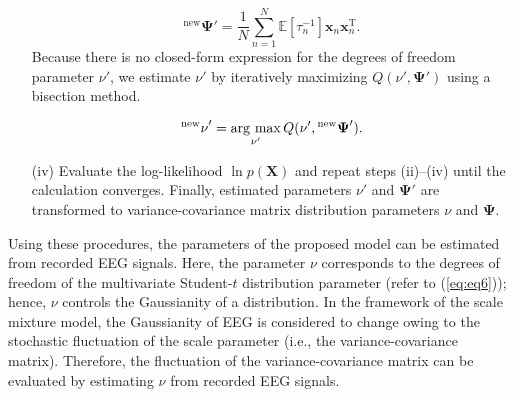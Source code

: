 \documentclass[journal]{IEEEtran}
\newcommand{\argmax}{\mathop{\rm arg\ max}\limits}
\begin{document}
\begin{enumerate}
\begin{equation}%
{^\mathrm{new} \mathbf{\Psi}}' = \frac{1}{N} \sum_{n=1}^{N} \mathbb{E}\left[\tau^{-1}_n\right] \mathbf{x}_n \mathbf{x}_n^\mathrm{T}.
\end{equation}
Because there is no closed-form expression for the degrees of freedom parameter $\nu'$, we estimate $\nu'$ by iteratively maximizing $Q(\nu',\mathbf{\Psi}')$ using a bisection method.

\begin{equation}%
{^\mathrm{new} \nu}' = \argmax_{\nu'}  Q(\nu', {^\mathrm{new} \mathbf{\Psi}}').
\end{equation}
\item[(iv)] Evaluate the log-likelihood $\ln{p(\mathbf{X})}$ and repeat steps (ii)--(iv) until the calculation converges. Finally, estimated parameters $\nu'$ and $\mathbf{\Psi}'$ are transformed to variance-covariance matrix distribution parameters $\nu$ and $\mathbf{\Psi}$.
\end{enumerate}
Using these procedures, the parameters of the proposed model can be estimated from recorded EEG signals.
Here, the parameter $\nu$ corresponds to the degrees of freedom of the multivariate Student-$t$ distribution parameter (refer to (\ref{eq:eq6})); hence, $\nu$ controls the Gaussianity of a distribution.
In the framework of the scale mixture model, the Gaussianity of EEG is considered to change owing to the stochastic fluctuation of the scale parameter (i.e., the variance-covariance matrix).
Therefore, the fluctuation of the variance-covariance matrix can be evaluated by estimating $\nu$ from recorded EEG signals.
 
\end{document}
